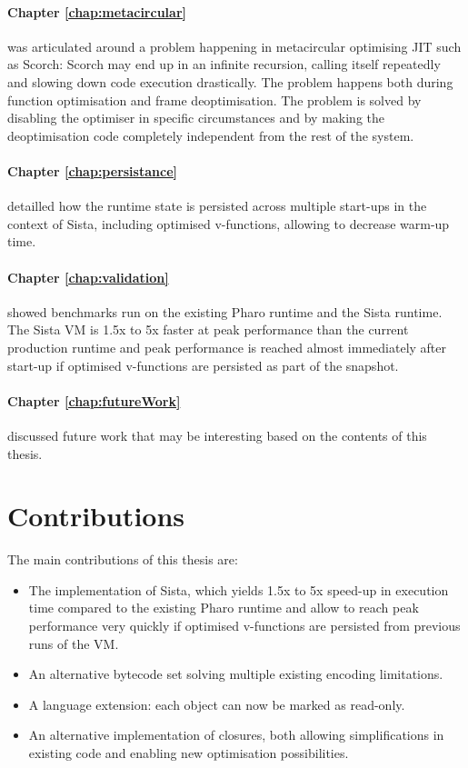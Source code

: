 \documentclass[a4paper,12pt,twoside]{../includes/ThesisStyle}
\begin{document}
\paragraph{Chapter \ref{chap:metacircular}} was articulated around a problem happening in metacircular optimising JIT such as Scorch: Scorch may end up in an infinite recursion, calling itself repeatedly and slowing down code execution drastically. The problem happens both during function optimisation and frame deoptimisation. The problem is solved by disabling the optimiser in specific circumstances and by making the deoptimisation code completely independent from the rest of the system.

\paragraph{Chapter \ref{chap:persistance}} detailled how the runtime state is persisted across multiple start-ups in the context of Sista, including optimised v-functions, allowing to decrease warm-up time. 

\paragraph{Chapter \ref{chap:validation}} showed benchmarks run on the existing Pharo runtime and the Sista runtime. The Sista VM is 1.5x to 5x faster at peak performance than the current production runtime and peak performance is reached almost immediately after start-up if optimised v-functions are persisted as part of the snapshot.

\paragraph{Chapter \ref{chap:futureWork}} discussed future work that may be interesting based on the contents of this thesis.

\section{Contributions}

The main contributions of this thesis are:
\begin{itemize}
	\item The implementation of Sista, which yields 1.5x to 5x speed-up in execution time compared to the existing Pharo runtime and allow to reach peak performance very quickly if optimised v-functions are persisted from previous runs of the VM.
	\item An alternative bytecode set solving multiple existing encoding limitations.
	\item A language extension: each object can now be marked as read-only.
	\item An alternative implementation of closures, both allowing simplifications in existing code and enabling new optimisation possibilities.
\end{itemize}
\end{document}
